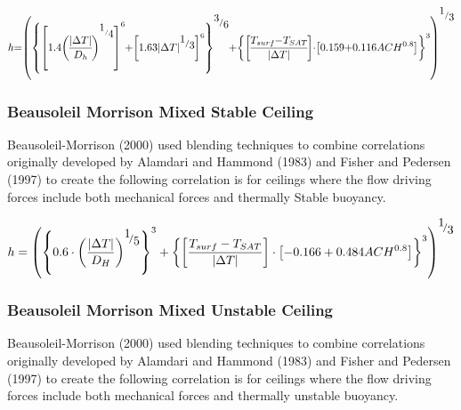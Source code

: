 \begin{equation}
\medmuskip=0mu
\thinmuskip=0mu
\thickmuskip=0mu
\nulldelimiterspace=0pt
\scriptspace=0pt
h = {\left( {{{\left\{ {{{\left[ {1.4{{\left( {\frac{{\left| {\Delta T} \right|}}{{{D_h}}}} \right)}^{^{{\raise0.7ex\hbox{1} \!\mathord{\left/ {\vphantom {1 4}}\right.}\!\lower0.7ex\hbox{4}}}}}} \right]}^6} + {{\left[ {1.63{{\left| {\Delta T} \right|}^{{\raise0.7ex\hbox{1} \!\mathord{\left/ {\vphantom {1 3}}\right.}\!\lower0.7ex\hbox{3}}}}} \right]}^6}} \right\}}^{{\raise0.7ex\hbox{3} \!\mathord{\left/ {\vphantom {3 6}}\right.}\!\lower0.7ex\hbox{6}}}} + {{\left\{ {\left[ {\frac{{{T_{surf}} - {T_{SAT}}}}{{\left| {\Delta T} \right|}}} \right]\cdot\left[ {0.159 + 0.116AC{H^{0.8}}} \right]} \right\}}^3}} \right)^{{\raise0.7ex\hbox{1} \!\mathord{\left/ {\vphantom {1 3}}\right.}\!\lower0.7ex\hbox{3}}}}
\end{equation}

\subsubsection{Beausoleil Morrison Mixed Stable Ceiling}\label{beausoleil-morrison-mixed-stable-ceiling}

Beausoleil-Morrison (2000) used blending techniques to combine correlations originally developed by Alamdari and Hammond (1983) and Fisher and Pedersen (1997) to create the following correlation is for ceilings where the flow driving forces include both mechanical forces and thermally Stable buoyancy.

\begin{equation}
h = {\left( {{{\left\{ {0.6 \cdot {{\left( {\frac{{\left| {\Delta T} \right|}}{{{D_H}}}} \right)}^{{\raise0.7ex\hbox{1} \!\mathord{\left/ {\vphantom {1 5}}\right.}\!\lower0.7ex\hbox{5}}}}} \right\}}^3} + {{\left\{ {\left[ {\frac{{{T_{surf}} - {T_{SAT}}}}{{\left| {\Delta T} \right|}}} \right]\cdot\left[ { - 0.166 + 0.484AC{H^{0.8}}} \right]} \right\}}^3}} \right)^{{\raise0.7ex\hbox{1} \!\mathord{\left/ {\vphantom {1 3}}\right.}\!\lower0.7ex\hbox{3}}}}
\end{equation}

\subsubsection{Beausoleil Morrison Mixed Unstable Ceiling}\label{beausoleil-morrison-mixed-unstable-ceiling}

Beausoleil-Morrison (2000) used blending techniques to combine correlations originally developed by Alamdari and Hammond (1983) and Fisher and Pedersen (1997) to create the following correlation is for ceilings where the flow driving forces include both mechanical forces and thermally unstable buoyancy.

